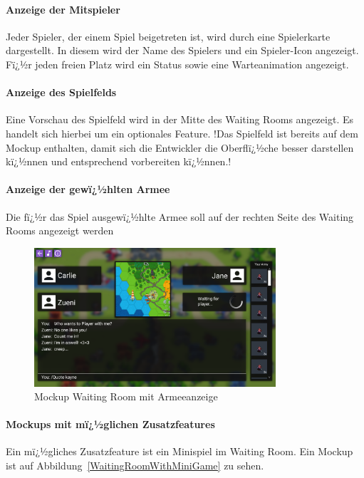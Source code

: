 \documentclass[12pt, titlepage]{scrartcl}
\newcommand{\Abb}[1]{%
	Abbildung\ \ref{#1}%
}
\begin{document}
		\paragraph{Anzeige der Mitspieler}
		Jeder Spieler, der einem Spiel beigetreten ist, wird durch eine \glqq Spielerkarte \grqq dargestellt. In diesem wird der Name des Spielers und ein Spieler-Icon angezeigt. Fï¿½r jeden freien Platz wird ein Status sowie eine Warteanimation angezeigt.  
		\paragraph{Anzeige des Spielfelds}
		Eine Vorschau des Spielfeld wird in der Mitte des Waiting Rooms angezeigt. Es handelt sich hierbei um ein optionales Feature. !Das Spielfeld ist bereits auf dem Mockup enthalten, damit sich die Entwickler die Oberflï¿½che besser darstellen kï¿½nnen und entsprechend vorbereiten kï¿½nnen.!
		\paragraph{Anzeige der gewï¿½hlten Armee}
		Die fï¿½r das Spiel ausgewï¿½hlte Armee soll auf der rechten Seite des Waiting Rooms angezeigt werden
		
		\begin{figure}[H] 
			\centering
			\includegraphics[width=0.8\textwidth]{Waiting_Room_Game_mit_ArmyView.png}
			\caption{Mockup Waiting Room mit Armeeanzeige}
			\label{WaitingRoomWithArmy}
		\end{figure}
	
		\paragraph{Mockups mit mï¿½glichen Zusatzfeatures}
		Ein mï¿½gliches Zusatzfeature ist ein Minispiel im Waiting Room. Ein Mockup ist auf \Abb{WaitingRoomWithMiniGame} zu sehen.
		
\end{document}
